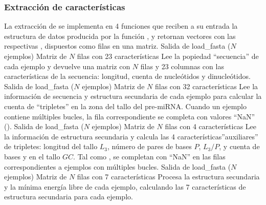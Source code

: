 %
\subsubsection{Extracción de características}
%
La extracción de  se implementa en 4 funciones que reciben a
su entrada la estructura de datos producida por la función
, y retornan vectores con las respectivas
, dispuestos como filas en una matriz.
%
          {Salida de load\_fasta ($N$ ejemplos)}
          {Matriz de $N$ filas con 23 características}
          {Lee la popiedad ``secuencia'' de cada ejemplo y devuelve
            una matriz con $N$ filas y 23 columnas con las
            características de la secuencia: longitud, cuenta de
            nucleótidos y dinucleótidos.}
%
           {Salida de load\_fasta ($N$ ejemplos)}
           {Matriz de $N$ filas con 32 características}
           {Lee la información de secuencia y estructura secundaria de
             cada ejemplo para calcular la cuenta de ``tripletes'' en
             la zona del tallo del pre-miRNA. Cuando un ejemplo
             contiene múltiples bucles, la fila correspondiente se
             completa con valores ``NaN'' ().}
%
           {Salida de load\_fasta ($N$ ejemplos)}
           {Matriz de $N$ filas con 4 características}
           {Lee la información de estructura secundaria y calcula las
             4 características''auxiliares'' de tripletes: longitud
             del tallo $L_3$, número de pares de bases $P$, $L_3/P$, y
             cuenta de bases \ntG y \ntC en el tallo $GC$.  Tal como
             , se completan con ``NaN'' en las
             filas correspondientes a ejemplos con múltiples bucles.}
%
           {Salida de load\_fasta ($N$ ejemplos)}
           {Matriz de $N$ filas con 7 características}
           {Procesa la estructura secundaria y la mínima energía libre
             de cada ejemplo, calculando las 7 características de
             estructura secundaria para cada ejemplo.}
%
